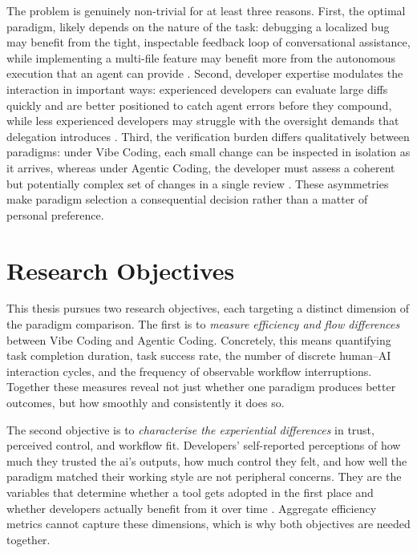 The problem is genuinely non-trivial for at least three reasons. First, the optimal paradigm, likely depends on the nature of the task: debugging a localized bug may benefit from the tight, inspectable feedback loop of conversational assistance, while implementing a multi-file feature may benefit more from the autonomous execution that an agent can provide \parencite{barke2023groundedcopilot, sarkar2025codewithme}. Second, developer expertise modulates the interaction in important ways: experienced developers can evaluate large diffs quickly and are better positioned to catch agent errors before they compound, while less experienced developers may struggle with the oversight demands that delegation introduces \parencite{sarkar2025codewithme}. Third, the verification burden differs qualitatively between paradigms: under Vibe Coding, each small change can be inspected in isolation as it arrives, whereas under Agentic Coding, the developer must assess a coherent but potentially complex set of changes in a single review \parencite[pp.~1--3]{vaithilingam2022expectation}. These asymmetries make paradigm selection a consequential decision rather than a matter of personal preference.

\section{Research Objectives}
\label{sec:intro-objectives}

This thesis pursues two research objectives, each targeting a distinct dimension of the paradigm comparison. The first is to \emph{measure efficiency and flow differences} between Vibe Coding and Agentic Coding. Concretely, this means quantifying task completion duration, task success rate, the number of discrete human--AI interaction cycles, and the frequency of observable workflow interruptions. Together these measures reveal not just whether one paradigm produces better outcomes, but how smoothly and consistently it does so.

The second objective is to \emph{characterise the experiential differences} in trust, perceived control, and workflow fit. Developers' self-reported perceptions of how much they trusted the \gls{ai}'s outputs, how much control they felt, and how well the paradigm matched their working style are not peripheral concerns. They are the variables that determine whether a tool gets adopted in the first place and whether developers actually benefit from it over time \parencite{vaithilingam2022expectation, barke2023trust}. Aggregate efficiency metrics cannot capture these dimensions, which is why both objectives are needed together.


